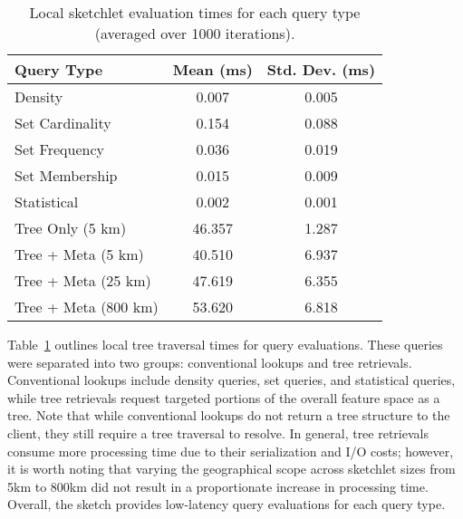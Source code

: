 \begin{table}[h!]
    \renewcommand{\arraystretch}{1.2}
    \caption{Local sketchlet evaluation times for each query type (averaged over 1000 iterations). \vspace{-1em}}
    \label{tbl:query-times}
    \begin{center}
        \begin{tabular}{|l|c|c|}
            \hline
            \textbf{Query Type}      & \textbf{Mean (ms)} & \textbf{Std. Dev. (ms)} \\
            \hline
            Density                  & 0.007                    & 0.005 \\
            \hline
            Set Cardinality          & 0.154                    & 0.088 \\
            \hline
            Set Frequency            & 0.036                    & 0.019 \\
            \hline
            Set Membership           & 0.015                    & 0.009 \\
            \hline
            Statistical               & 0.002                    & 0.001 \\
            \hline
            \hline
            Tree Only (5 km)        & 46.357                   & 1.287 \\
            \hline
            Tree + Meta (5 km)      & 40.510                   & 6.937 \\
            \hline
            Tree + Meta (25 km)     & 47.619                   & 6.355 \\
            \hline
            Tree + Meta (800 km)    & 53.620                   & 6.818 \\
            \hline
        \end{tabular}
    \end{center}
\end{table}
Table~\ref{tbl:query-times} outlines local tree traversal times for query evaluations. These queries were separated into two groups: conventional lookups and tree retrievals. Conventional lookups include density queries, set queries, and statistical queries, while tree retrievals request targeted portions of the overall feature space as a tree.  Note that while conventional lookups do not return a tree structure to the client, they still require a tree traversal to resolve. In general, tree retrievals consume more processing time due to their serialization and I/O costs; however, it is worth noting that varying the geographical scope across sketchlet sizes from 5km to 800km did not result in a proportionate increase in processing time. Overall, the sketch provides low-latency query evaluations for each query type.
